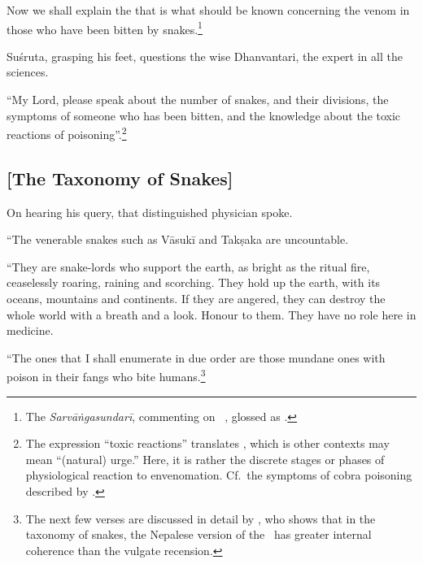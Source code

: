 \begin{translation}
    \item[1] Now we shall explain the  that is what
should be known concerning the venom in those who have been bitten by
snakes.\footnote{\label{arunadatta:kalpa}The \emph{Sarvāṅgasundarī},
    commenting on \AH\ , glossed  as
    .}
    
    \item[3] Suśruta, grasping his feet, questions the wise Dhanvantari, the 
    expert in all the sciences.



    \item[4]
    
    “My Lord, please speak about the number of snakes, and their
divisions, the symptoms of someone who has been bitten, and the
knowledge about the toxic reactions of
poisoning”.\footnote{The expression “toxic reactions” translates
    , which is other contexts may mean “(natural) urge.”  Here,
    it is rather the discrete stages or phases of physiological reaction
    to envenomation.  Cf.\ the symptoms of cobra poisoning described by
    \citet[80]{wall-1913}.}
        
        
\subsection{[The Taxonomy of Snakes]}
        
    \item[5]
    
    On hearing his query, that distinguished physician spoke.
    
    “The venerable snakes such as Vāsukī and Takṣaka are uncountable. 
    
\item[6--9ab]

“They are snake-lords who support the earth, as bright as the ritual fire,
ceaselessly roaring, raining and scorching. They hold up the earth, with its
oceans, mountains and continents. If they are angered, they can destroy the
whole world with a breath and a look.  Honour to them. They have no role
here in medicine.

“The ones that I shall enumerate in due order are those mundane
ones with poison in their fangs who bite humans.\footnote{The next few
    verses are discussed in detail by \citet[101--104]{hari-2011}, who shows
    that in the taxonomy of snakes, the Nepalese version of the \SS\ has greater
    internal coherence than the vulgate recension.}


\end{translation}

